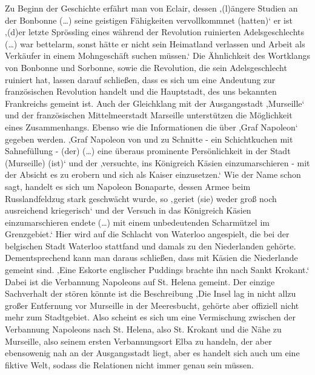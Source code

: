 Zu Beginn der Geschichte erfährt man von Eclair, dessen ‚(l)ängere Studien an der Bonbonne (…) seine geistigen Fähigkeiten vervollkommnet (hatten)‘\cite[S.15]{pir} er ist ‚(d)er letzte Sprössling eines während der Revolution ruinierten Adelsgeschlechts (…) war bettelarm, sonst hätte er nicht sein Heimatland verlassen und Arbeit als Verkäufer in einem Mohngeschäft suchen müssen.‘\cite[S.15f]{pir} Die Ähnlichkeit des Wortklangs von Bonbonne und Sorbonne, sowie die Revolution, die sein Adelsgeschlecht ruiniert hat, lassen darauf schließen, dass es sich um eine Andeutung zur französischen Revolution handelt und die Hauptstadt, des uns bekannten Frankreichs gemeint ist. Auch der Gleichklang mit der Ausgangsstadt ‚Murseille‘\cite[S.13]{pir} und der französischen Mittelmeerstadt Marseille unterstützen die Möglichkeit eines Zusammenhangs. Ebenso wie die Informationen die über ‚Graf Napoleon‘ \cite[S.17f]{pir} gegeben werden.
‚Graf Napoleon von und zu Schnitte - ein Schichtkuchen mit Sahnefüllung - (der) (…) eine überaus prominente Persönlichkeit in der Stadt (Murseille) (ist)‘\cite[S.17]{pir} und der ‚versuchte, ins Königreich Käsien einzumarschieren - mit der Absicht es zu erobern und sich als Kaiser einzusetzen.‘\cite[S.18]{pir} Wie der Name schon sagt, handelt es sich um Napoleon Bonaparte, dessen Armee beim Russlandfeldzug stark geschwächt wurde‚ so ‚geriet (sie) weder groß noch ausreichend kriegerisch‘\cite[S.18]{pir} und der Versuch in das Königreich Käsien einzumarschieren \cite[S.18]{pir} endete (…) mit einem unbedeutenden Scharmützel im Grenzgebiet.‘ Hier wird auf die Schlacht von Waterloo angespielt, die bei der belgischen Stadt Waterloo stattfand und damals zu den Niederlanden gehörte. Dementsprechend kann man daraus schließen, dass mit Käsien die Niederlande gemeint sind. ‚Eine Eskorte englischer Puddings brachte ihn nach Sankt Krokant.‘\cite[S.18]{pir} Dabei ist die Verbannung Napoleons auf St. Helena gemeint. Der einzige Sachverhalt der stören könnte ist die Beschreibung ‚Die Insel lag in nicht allzu großer Entfernung vor Murseille in der Meeresbucht, gehörte aber offiziell nicht mehr zum Stadtgebiet. Also scheint es sich um eine Vermischung zwischen der Verbannung Napoleons nach St. Helena, also St. Krokant und die Nähe zu Murseille, also seinem ersten Verbannungsort Elba zu handeln, der aber ebensowenig nah an der Ausgangsstadt liegt, aber es handelt sich auch um eine fiktive Welt, sodass die Relationen nicht immer genau sein müssen.

